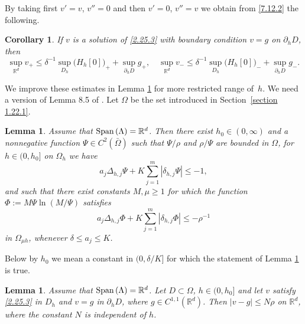 \documentclass[11pt, reqno]{amsart}
\newtheorem{lemma}[theorem]{Lemma}
\newtheorem{corollary}[theorem]{Corollary}
\theoremstyle{definition}
\theoremstyle{remark}
\begin{document}
By taking first $v'=v$, $v''=0$ and then $v'=0$, $v''=v$
we obtain from \eqref{7.12.2} the following. 

\begin{corollary}
                                       \label{corollary 7.12.1}
If $v$ is a solution of \eqref{2.25.3} with  
boundary condition $v=g$ on $\partial_{h}D$, then
$$
\sup_{{\mathbb{R}}^{d}}v_{+}\leq\delta^{-1}\sup_{D_{h}}
\big(H_{h}[0])_{+}+\sup_{\partial_{h}D}g_{+},\quad
\sup_{{\mathbb{R}}^{d}}v_{-}\leq\delta^{-1}\sup_{D_{h}}
\big(H_{h}[0])_{-}+\sup_{\partial_{h}D}g_{-}.
$$
\end{corollary}
 
We improve these estimates
in Lemma \ref{lemma 7.4.1}
 for more restricted range of~$h$.
We need a version of   Lemma 8.5 of \cite{Kr11}.
Let $\Omega$ be the set introduced in 
Section~\ref{section 1.22.1}.
\begin{lemma}
                                        \label{lemma 7.7.1}
Assume that ${\rm Span}\,(\Lambda)={\mathbb{R}}^{d}$.
Then there exist $h_{0}\in(0,\infty)$
and a nonnegative function $\Psi\in C^{2}(\bar{\Omega})$
 such that   $\Psi/\rho$ and $\rho/\Psi$ are bounded in $\Omega$,
for   $h\in(0,h_{0}]$ on $\Omega_{h}$ we have
\begin{equation}
                                           \label{7.3.1}
a_{j}\Delta_{h,j}\Psi + K
\sum_{j=1}^{m}|\delta_{h,j}\Psi |\leq-1,
\end{equation}
and such that there exist   constants $M,\mu\geq1$ for which
the function $\Phi:=M\Psi\ln(M/\Psi)$
satisfies
\begin{equation}
                                           \label{5.15.4}
a_{j}\Delta_{h,j}\Phi  
+ K\sum_{j=1}^{m}|\delta_{h,j}\Phi  |
\leq -\rho^{-1} 
\end{equation}
in $\Omega_{\mu h}$, whenever $\delta\leq a_{j}\leq K$. 
\end{lemma}

Below by $h_{0}$ we mean a constant in $(0,\delta/K]$
for which the statement of Lemma 
\ref{lemma 7.7.1} is true.

\begin{lemma}  
                                       \label{lemma 7.4.1}
         Assume that ${\rm Span}\,(\Lambda)={\mathbb{R}}^{d}$.
Let $D\subset \Omega$, $h\in(0,h_{0}]$ and let $v$ satisfy
\eqref{2.25.3} in $D_{h}$ and $v=g$ in $\partial_{h}D$,
where $g\in C^{1,1}({\mathbb{R}}^{d})$.
Then $|v-g |\leq N \rho $ on ${\mathbb{R}}^{d}$, where the constant
$N$ is independent of $h$.
\end{lemma}
\end{document}
